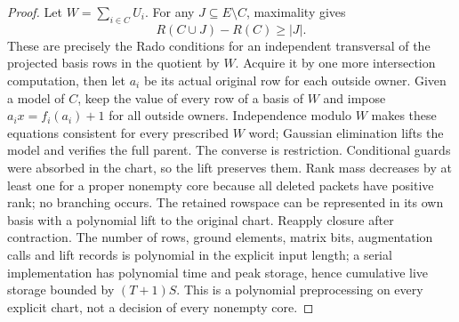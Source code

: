\documentclass[11pt]{article}
\begin{document}
\begin{proof}
Let $W=\sum_{i\in C}U_i$. For any $J\subseteq E\setminus C$, maximality gives
\[
 R(C\cup J)-R(C)\ge |J|.
\]
These are precisely the Rado conditions for an independent transversal of the projected basis rows in the quotient by $W$. Acquire it by one more intersection computation, then let $a_i$ be its actual original row for each outside owner. Given a model of $C$, keep the value of every row of a basis of $W$ and impose $a_i x=f_i(a_i)+1$ for all outside owners. Independence modulo $W$ makes these equations consistent for every prescribed $W$ word; Gaussian elimination lifts the model and verifies the full parent. The converse is restriction. Conditional guards were absorbed in the chart, so the lift preserves them. Rank mass decreases by at least one for a proper nonempty core because all deleted packets have positive rank; no branching occurs. The retained rowspace can be represented in its own basis with a polynomial lift to the original chart. Reapply closure after contraction. The number of rows, ground elements, matrix bits, augmentation calls and lift records is polynomial in the explicit input length; a serial implementation has polynomial time and peak storage, hence cumulative live storage bounded by $(T+1)S$. This is a polynomial preprocessing on every explicit chart, not a decision of every nonempty core.
\end{proof}
\end{document}

